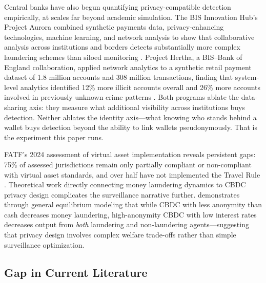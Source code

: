 \documentclass[11pt]{article}
\begin{document}
Central banks have also begun quantifying privacy-compatible detection empirically, at scales far beyond academic simulation. The BIS Innovation Hub's Project Aurora combined synthetic payments data, privacy-enhancing technologies, machine learning, and network analysis to show that collaborative analysis across institutions and borders detects substantially more complex laundering schemes than siloed monitoring \citep{BISAurora2023}. Project Hertha, a BIS--Bank of England collaboration, applied network analytics to a synthetic retail payment dataset of 1.8 million accounts and 308 million transactions, finding that system-level analytics identified 12\% more illicit accounts overall and 26\% more accounts involved in previously unknown crime patterns \citep{BISHertha2025}. Both programs ablate the data-sharing axis: they measure what additional visibility across institutions buys detection. Neither ablates the identity axis---what knowing who stands behind a wallet buys detection beyond the ability to link wallets pseudonymously. That is the experiment this paper runs.

FATF's 2024 assessment of virtual asset implementation reveals persistent gaps: 75\% of assessed jurisdictions remain only partially compliant or non-compliant with virtual asset standards, and over half have not implemented the Travel Rule \citep{FATF2024}. Theoretical work directly connecting money laundering dynamics to CBDC privacy design complicates the surveillance narrative further. \citet{MLPrivacyCBDC2023} demonstrates through general equilibrium modeling that while CBDC with less anonymity than cash decreases money laundering, high-anonymity CBDC with low interest rates decreases output from \textit{both} laundering and non-laundering agents---suggesting that privacy design involves complex welfare trade-offs rather than simple surveillance optimization.

\subsection{Gap in Current Literature}
\end{document}
